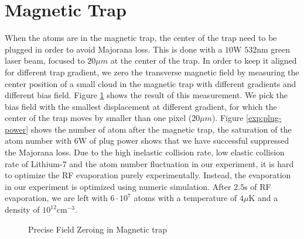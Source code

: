 \section{Magnetic Trap}\label{exp:mt}
When the atoms are in the magnetic trap, the center of the trap need to be plugged in order to avoid Majorana loss. This is done with a $10$W $532$nm green laser beam, focused to $20\mu m$ at the center of the trap. In order to keep it aligned for different trap gradient, we zero the transverse magnetic field by measuring the center position of a small cloud in the magnetic trap with different gradients and different bias field. Figure \ref{exp:field-zeroing} shows the result of this measurement. We pick the bias field with the smallest displacement at different gradient, for which the center of the trap moves by smaller than one pixel ($20\mu m$). Figure \ref{exp:plug-power} shows the number of atom after the magnetic trap, the saturation of the atom number with $6$W of plug power shows that we have successful suppressed the Majorana loss. Due to the high inelastic collision rate, low elastic collision rate of Lithium-$7$ and the atom number fluctuation in our experiment, it is hard to optimize the RF evaporation purely experimentally. Instead, the evaporation in our experiment is optimized using numeric simulation. After $2.5$s of RF evaporation, we are left with $6\cdot10^7$ atoms with a temperature of $4\mu$K and a density of $10^{12}\text{cm}^{-3}$.
\begin{figure}
  \begin{center}
  \end{center}
  \caption{Precise Field Zeroing in Magnetic trap}
  \label{exp:field-zeroing}
\end{figure}
